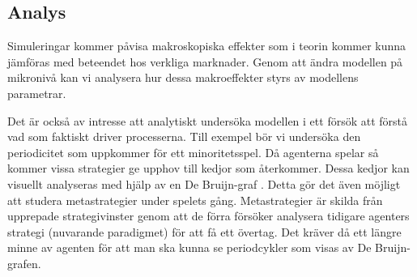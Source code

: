 
\subsection{Analys}

Simuleringar kommer påvisa makroskopiska effekter som i teorin kommer kunna jämföras med beteendet hos verkliga marknader. Genom att ändra modellen på mikronivå kan vi analysera hur dessa makroeffekter styrs av modellens parametrar.  





Det är också av intresse att analytiskt undersöka modellen i ett försök att förstå vad som faktiskt driver processerna. Till exempel bör vi undersöka den periodicitet som uppkommer för ett minoritetsspel. Då agenterna spelar så kommer vissa strategier ge upphov till kedjor som återkommer. Dessa kedjor kan visuellt analyseras med hjälp av en De Bruijn-graf \cite{Periodicity}. Detta gör det även möjligt att studera metastrategier under spelets gång. Metastrategier är skilda från upprepade strategivinster genom att de förra försöker analysera tidigare agenters strategi (nuvarande paradigmet) för att få ett övertag. Det kräver då ett längre minne av agenten för att man ska kunna se periodcykler som visas av De Bruijn-grafen.








